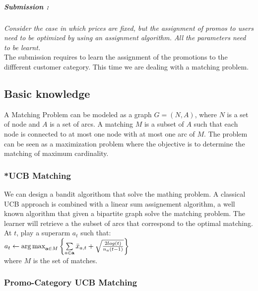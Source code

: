 \subparagraph*{Submission : }
\textit{Consider the case in which prices are fixed, but the assignment of promos to users need to be optimized by using an assignment algorithm. All the parameters need to be learnt.}\\

The submission requires to learn the assignment of the promotions to the diffferent customer category. This time we are dealing with a matching problem. 

\subsection*{Basic knowledge}
A Matching Problem can be modeled as a graph $G=(N,A)$, where $N$ is a set of node and $A$ is a set of arcs. A matching $M$ is a subset of $A$ such that each node is connected to at most one node with at most one arc of $M$. The problem can be seen as a maximization problem where the objective is to determine the matching of maximum cardinality.\\

\subsubsection{*UCB Matching}
We can design a bandit algorithom that solve the mathing problem. A classical UCB approach is combined with a linear sum assignement algorithm, a well known algorithm that given a bipartite graph solve the matching problem. The learner will retrieve a the subset of arcs that correspond to the optimal matching. 
At $t$, play a superarm $a_{t}$ such that:\\
$a_{t} \leftarrow \operatorname{arg\,max}\limits_{\textbf{a} \in M}{\left\{\sum\limits_{a \in \textbf{a}}\bar{x}_{a,t} + \sqrt{\frac{2 log(t)}{{n_{a}(t-1)}} }\right\}}$ \\
where $M$ is the set of matches.

\subsubsection*{Promo-Category UCB Matching}

